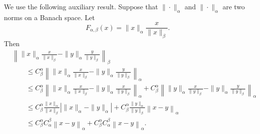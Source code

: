\documentclass[10pt,a4paper]{article}
\begin{document}
    We use the following auxiliary result. 
    Suppose that $\|\cdot\|_{\alpha}$ and $\|\cdot\|_{\alpha}$ are two norms on a Banach space.
    Let 
    $$
        F_{\alpha,\beta}(x) = \| x \|_{\alpha} \frac{ x }{ \| x \|_{\beta} }.
    $$
    Then 
    \begin{align*}
        &
        \left\| 
            \| x \|_{\alpha} \frac{ x }{ \| x \|_{\beta} } 
            - 
            \| y \|_{\alpha} \frac{ y }{ \| y \|_{\beta} } 
        \right\|_{\beta}
        \\&\qquad 
        \leq 
        C_{\beta}^{\alpha} 
        \left\| 
            \| x \|_{\alpha} \frac{ x }{ \| x \|_{\beta} } 
            - 
            \| y \|_{\alpha} \frac{ y }{ \| y \|_{\beta} } 
        \right\|_{\alpha}
        \\&\qquad 
        \leq 
        C_{\beta}^{\alpha} 
        \left\| 
            \| x \|_{\alpha} \frac{ x }{ \| x \|_{\beta} } 
            - 
            \| y \|_{\alpha} \frac{ x }{ \| y \|_{\beta} } 
        \right\|_{\alpha}
        +
        C_{\beta}^{\alpha} 
        \left\| 
            \| y \|_{\alpha} \frac{ x }{ \| y \|_{\beta} } 
            - 
            \| y \|_{\alpha} \frac{ y }{ \| y \|_{\beta} } 
        \right\|_{\alpha}
        \\&\qquad 
        \leq 
        C_{\beta}^{\alpha} 
        \frac{ \| x \|_{\alpha} }{ \| x \|_{\beta} } 
        \left| 
            \| x \|_{\alpha}
            - 
            \| y \|_{\alpha}
        \right|
        +
        C_{\beta}^{\alpha} 
        \frac{ \| y \|_{\alpha} }{ \| y \|_{\beta} } 
        \left\| x - y \right\|_{\alpha}
        \\&\qquad 
        \leq 
        C_{\beta}^{\alpha} 
        C_{\alpha}^{\beta} 
        \left\| x - y \right\|_{\alpha}
        +
        C_{\beta}^{\alpha} 
        C_{\alpha}^{\beta} 
        \left\| x - y \right\|_{\alpha}
        .
    \end{align*}
\end{document}
